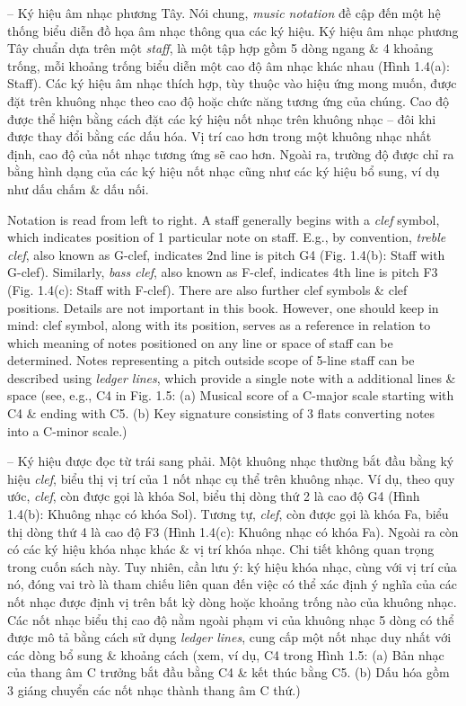 \documentclass{article}
\begin{document}
\begin{itemize}
\begin{itemize}
\begin{itemize}
			-- {\sf Ký hiệu âm nhạc phương Tây.} Nói chung, {\it music notation} đề cập đến một hệ thống biểu diễn đồ họa âm nhạc thông qua các ký hiệu. Ký hiệu âm nhạc phương Tây chuẩn dựa trên một {\it staff}, là một tập hợp gồm 5 dòng ngang \& 4 khoảng trống, mỗi khoảng trống biểu diễn một cao độ âm nhạc khác nhau ({\sf Hình 1.4(a): Staff}). Các ký hiệu âm nhạc thích hợp, tùy thuộc vào hiệu ứng mong muốn, được đặt trên khuông nhạc theo cao độ hoặc chức năng tương ứng của chúng. Cao độ được thể hiện bằng cách đặt các ký hiệu nốt nhạc trên khuông nhạc -- đôi khi được thay đổi bằng các dấu hóa. Vị trí cao hơn trong một khuông nhạc nhất định, cao độ của nốt nhạc tương ứng sẽ cao hơn. Ngoài ra, trường độ được chỉ ra bằng hình dạng của các ký hiệu nốt nhạc cũng như các ký hiệu bổ sung, ví dụ như dấu chấm \& dấu nối.
			
			Notation is read from left to right. A staff generally begins with a {\it clef} symbol, which indicates position of 1 particular note on staff. E.g., by convention, {\it treble clef}, also known as G-clef, indicates 2nd line is pitch G4 ({\sf Fig. 1.4(b): Staff with G-clef}). Similarly, {\it bass clef}, also known as F-clef, indicates 4th line is pitch F3 ({\sf Fig. 1.4(c): Staff with F-clef}). There are also further clef symbols \& clef positions. Details are not important in this book. However, one should keep in mind: clef symbol, along with its position, serves as a reference in relation to which meaning of notes positioned on any line or space of staff can be determined. Notes representing a pitch outside scope of 5-line staff can be described using {\it ledger lines}, which provide a single note with a additional lines \& space (see, e.g., C4 in {\sf Fig. 1.5: (a) Musical score of a C-major scale starting with C4 \& ending with C5. (b) Key signature consisting of 3 flats converting notes into a C-minor scale.})
			
			-- Ký hiệu được đọc từ trái sang phải. Một khuông nhạc thường bắt đầu bằng ký hiệu {\it clef}, biểu thị vị trí của 1 nốt nhạc cụ thể trên khuông nhạc. Ví dụ, theo quy ước, {\it clef}, còn được gọi là khóa Sol, biểu thị dòng thứ 2 là cao độ G4 ({\sf Hình 1.4(b): Khuông nhạc có khóa Sol}). Tương tự, {\it clef}, còn được gọi là khóa Fa, biểu thị dòng thứ 4 là cao độ F3 ({\sf Hình 1.4(c): Khuông nhạc có khóa Fa}). Ngoài ra còn có các ký hiệu khóa nhạc khác \& vị trí khóa nhạc. Chi tiết không quan trọng trong cuốn sách này. Tuy nhiên, cần lưu ý: ký hiệu khóa nhạc, cùng với vị trí của nó, đóng vai trò là tham chiếu liên quan đến việc có thể xác định ý nghĩa của các nốt nhạc được định vị trên bất kỳ dòng hoặc khoảng trống nào của khuông nhạc. Các nốt nhạc biểu thị cao độ nằm ngoài phạm vi của khuông nhạc 5 dòng có thể được mô tả bằng cách sử dụng {\it ledger lines}, cung cấp một nốt nhạc duy nhất với các dòng bổ sung \& khoảng cách (xem, ví dụ, C4 trong {\sf Hình 1.5: (a) Bản nhạc của thang âm C trưởng bắt đầu bằng C4 \& kết thúc bằng C5. (b) Dấu hóa gồm 3 giáng chuyển các nốt nhạc thành thang âm C thứ.})
			

\end{itemize}
\end{itemize}
\end{itemize}
\end{document}
